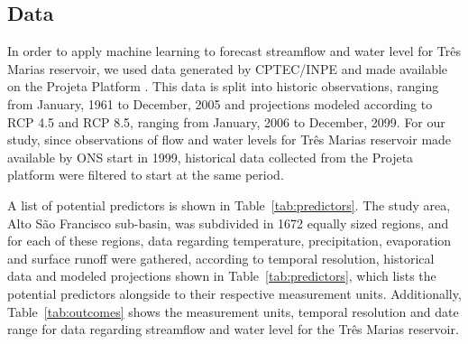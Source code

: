 \documentclass[12pt]{article}
\begin{document}
\subsection{Data}
In order to apply machine learning to forecast streamflow and water level for Três Marias reservoir, we used data generated by CPTEC/INPE and made available on the Projeta Platform \cite{chou2014assessment,chou2014evaluation,Lyra2018}. This data is split into historic observations, ranging from January, 1961 to December, 2005 and projections modeled according to RCP 4.5 and RCP 8.5, ranging from January, 2006 to December, 2099. For our study, since observations of flow and water levels for Três Marias reservoir made available by ONS \cite{onsnivel,onsvazao} start in 1999, historical data collected from the Projeta platform were filtered to start at the same period.

A list of potential predictors is shown in Table~\ref{tab:predictors}. The study area, Alto São Francisco sub-basin, was subdivided in 1672 equally sized regions, and for each of these regions, data regarding temperature, precipitation, evaporation and surface runoff were gathered, according to temporal resolution, historical data and modeled projections shown in Table~\ref{tab:predictors}, which lists the potential predictors alongside to their respective measurement units. Additionally, Table~\ref{tab:outcomes} shows the measurement units, temporal resolution and date range for data regarding streamflow and water level for the Três Marias reservoir.

\begin{table}[htbp]
\centering
\caption{Relation of predictors considered in this study obtained on the Projeta Platform \cite{chou2014assessment,chou2014evaluation,Lyra2018}}
\label{tab:predictors}
\end{table}
\end{document}
